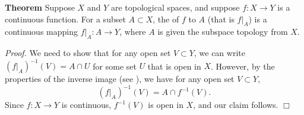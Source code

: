 \documentclass[12pt]{article}
\begin{document}
{\bf Theorem} Suppose $X$ and $Y$ are topological spaces, and suppose
$f:X\to Y$ is a continuous function. For a subset $A\subset X$,
the  
of $f$ to $A$ (that is $f|_A$) is a continuous
mapping $f|_A:A\to Y$, where $A$ is given the subspace topology
from $X$.

\emph{Proof.} We need to show that for any open set $V\subset Y$, we
can write $(f|_A)^{-1}(V) = A\cap U$ for some set $U$ that is open in $X$.
However, by the properties of the inverse image (see
), we have for any open set $V\subset Y$,
$$ (f|_A)^{-1}(V) = A\cap f^{-1}(V).$$
Since $f:X\to Y$ is continuous, $f^{-1}(V)$ is open in $X$, and
our claim follows. $\Box$
\end{document}
